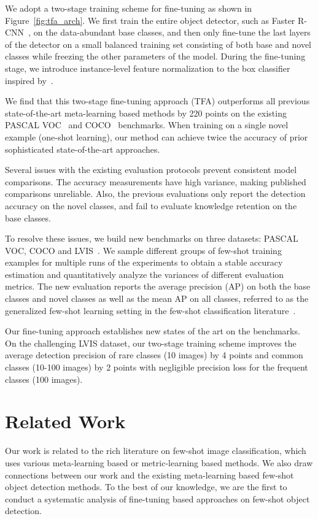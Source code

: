 \documentclass{article}
\newcommand{\model}{TFA\xspace}
\begin{document}
We adopt a two-stage training scheme for fine-tuning as shown in Figure~\ref{fig:tfa_arch}. We first train the entire object detector, such as Faster R-CNN~\cite{ren2015faster}, on the data-abundant base classes, and then only fine-tune the last layers of the detector
on a small balanced training set consisting of both base and novel classes while freezing the other parameters of the model. 
During the fine-tuning stage, we introduce instance-level feature normalization to the box classifier inspired by~\citet{gidaris2018dynamic,qi2018low,chen2019closer}. 


We find that this two-stage fine-tuning approach (\model) outperforms all previous
state-of-the-art meta-learning based methods by 220 points on the existing PASCAL
VOC~\cite{pascal-voc-2007} and COCO~\cite{Lin2014MicrosoftCC} benchmarks. 
When training on a single novel example (one-shot learning), our method can achieve twice
the accuracy of prior sophisticated state-of-the-art approaches.



Several issues with the existing evaluation protocols prevent consistent model comparisons. The accuracy measurements have high variance, making published comparisons unreliable.  Also, the previous evaluations only report the detection accuracy on the novel classes, and fail to evaluate knowledge retention on the base classes.


To resolve these issues, we build new benchmarks on three datasets: PASCAL VOC, COCO and LVIS~\cite{gupta2019lvis}.
We sample different groups of few-shot training examples for multiple runs of the experiments to obtain a stable accuracy estimation and quantitatively analyze the variances of different evaluation metrics. The new evaluation reports the average precision (AP) on both the base classes and novel classes as well as the mean AP on all classes, referred to as the generalized few-shot learning setting in the few-shot classification literature~\cite{hariharan2017low,wang2019tafe}.

Our fine-tuning approach establishes new states of the art on the benchmarks.  
On the challenging LVIS dataset, our two-stage training scheme improves the average detection precision of rare classes
(10 images) by 4 points and common classes (10-100 images) by 2 points with negligible precision loss for the frequent classes (100 images). 
 \section{Related Work}
Our work is related to the rich literature on few-shot image classification, which uses various 
meta-learning based or metric-learning based methods. We also draw connections between our work and the existing meta-learning based few-shot object detection methods. To the best of our knowledge, we are the first to conduct a systematic analysis of fine-tuning based approaches on few-shot object detection. 
\end{document}
